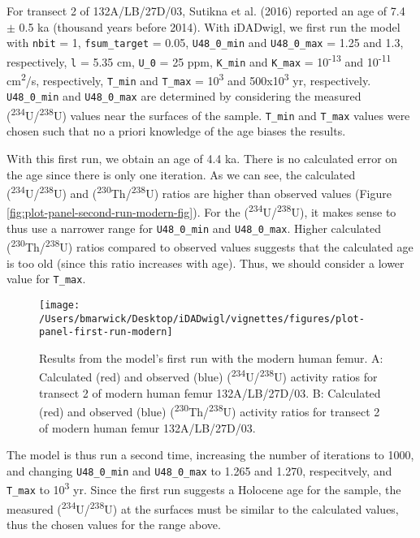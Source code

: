 \documentclass[]{elsarticle} %
\begin{document}
For transect 2 of 132A/LB/27D/03, Sutikna et al. (2016) reported an age of 7.4 \(\pm\) 0.5 ka (thousand years before 2014). With iDADwigl, we first run the model with \texttt{nbit} = 1, \texttt{fsum\_target} = 0.05, \texttt{U48\_0\_min} and \texttt{U48\_0\_max} = 1.25 and 1.3, respectively, \texttt{l} = 5.35 cm, \texttt{U\_0} = 25 ppm, \texttt{K\_min} and \texttt{K\_max} = 10\textsuperscript{-13} and 10\textsuperscript{-11} cm\textsuperscript{2}/s, respectively, \texttt{T\_min} and \texttt{T\_max} = 10\textsuperscript{3} and 500x10\textsuperscript{3} yr, respectively. \texttt{U48\_0\_min} and \texttt{U48\_0\_max} are determined by considering the measured (\textsuperscript{234}U/\textsuperscript{238}U) values near the surfaces of the sample. \texttt{T\_min} and \texttt{T\_max} values were chosen such that no a priori knowledge of the age biases the results.

With this first run, we obtain an age of 4.4 ka. There is no calculated error on the age since there is only one iteration. As we can see, the calculated (\textsuperscript{234}U/\textsuperscript{238}U) and (\textsuperscript{230}Th/\textsuperscript{238}U) ratios are higher than observed values (Figure \ref{fig:plot-panel-second-run-modern-fig}). For the (\textsuperscript{234}U/\textsuperscript{238}U), it makes sense to thus use a narrower range for \texttt{U48\_0\_min} and \texttt{U48\_0\_max}. Higher calculated (\textsuperscript{230}Th/\textsuperscript{238}U) ratios compared to observed values suggests that the calculated age is too old (since this ratio increases with age). Thus, we should consider a lower value for \texttt{T\_max}.



\begin{figure}
\texttt{[image: /Users/bmarwick/Desktop/iDADwigl/vignettes/figures/plot-panel-first-run-modern]} \caption{Results from the model's first run with the modern human femur. A: Calculated (red) and observed (blue) (\textsuperscript{234}U/\textsuperscript{238}U) activity ratios for transect 2 of modern human femur 132A/LB/27D/03. B: Calculated (red) and observed (blue) (\textsuperscript{230}Th/\textsuperscript{238}U) activity ratios for transect 2 of modern human femur 132A/LB/27D/03.}\label{fig:plot-panel-first-run-modern-fig}
\end{figure}

\FloatBarrier

The model is thus run a second time, increasing the number of iterations to 1000, and changing \texttt{U48\_0\_min} and \texttt{U48\_0\_max} to 1.265 and 1.270, respecitvely, and \texttt{T\_max} to 10\textsuperscript{3} yr. Since the first run suggests a Holocene age for the sample, the measured (\textsuperscript{234}U/\textsuperscript{238}U) at the surfaces must be similar to the calculated values, thus the chosen values for the range above.
\end{document}
